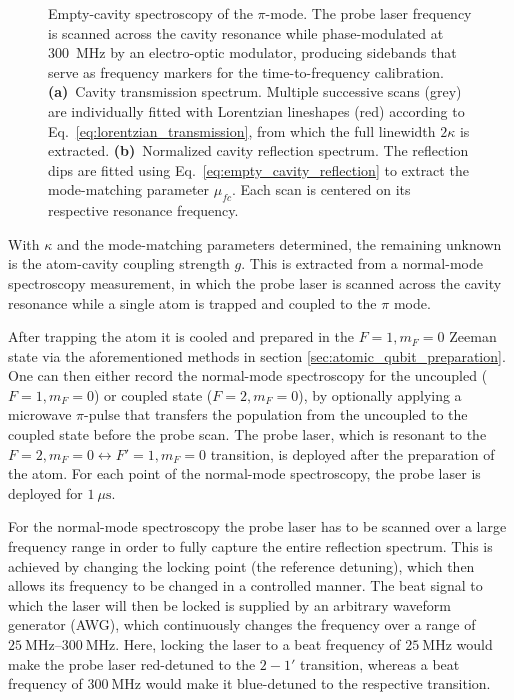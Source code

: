 \begin{figure}[htbp]
	\centering
	
	\caption{Empty-cavity spectroscopy of the $\pi$-mode. The probe laser frequency is scanned across the cavity resonance while phase-modulated at \SI{300}{\mega\hertz} by an electro-optic modulator, producing sidebands that serve as frequency markers for the time-to-frequency calibration. \textbf{(a)}~Cavity transmission spectrum. Multiple successive scans (grey) are individually fitted with Lorentzian lineshapes (red) according to Eq.~\eqref{eq:lorentzian_transmission}, from which the full linewidth $2\kappa$ is extracted. \textbf{(b)}~Normalized cavity reflection spectrum. The reflection dips are fitted using Eq.~\eqref{eq:empty_cavity_reflection} to extract the mode-matching parameter $\mu_{fc}$. Each scan is centered on its respective resonance frequency.}
	\label{fig:empty_cavity_spectroscopy}
\end{figure}

With $\kappa$ and the mode-matching parameters determined, the remaining unknown is the atom-cavity coupling strength $g$. This is extracted from a normal-mode spectroscopy measurement, in which the probe laser is scanned across the cavity resonance while a single atom is trapped and coupled to the $\pi$ mode.

After trapping the atom it is cooled and prepared in the $F=1,m_F=0$ Zeeman state via the aforementioned methods in section \ref{sec:atomic_qubit_preparation}. One can then either record the normal-mode spectroscopy for the uncoupled ($F=1,m_F=0$) or coupled state ($F=2,m_F=0$), by optionally applying a microwave $\pi$-pulse that transfers the population from the uncoupled to the coupled state before the probe scan. The probe laser, which is resonant to the $F=2,m_F=0\leftrightarrow F'=1,m_F=0$ transition, is deployed after the preparation of the atom. For each point of the normal-mode spectroscopy, the probe laser is deployed for $\SI{1}{\mu\second}$.

For the normal-mode spectroscopy the probe laser has to be scanned over a large frequency range in order to fully capture the entire reflection spectrum. This is achieved by changing the locking point (the reference detuning), which then allows its frequency to be changed in a controlled manner. The beat signal to which the laser will then be locked is supplied by an arbitrary waveform generator (AWG), which continuously changes the frequency over a range of $\SIrange{25}{300}{\mega\hertz}$. Here, locking the laser to a beat frequency of $\SI{25}{\mega\hertz}$ would make the probe laser red-detuned to the $2-1'$ transition, whereas a beat frequency of $\SI{300}{\mega\hertz}$ would make it blue-detuned to the respective transition.

